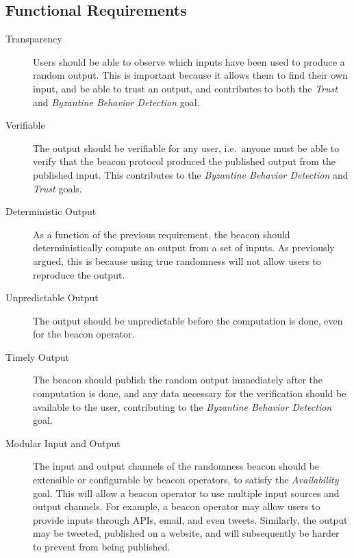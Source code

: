 \subsection{Functional Requirements}
\label{sub:functional_requirements}
\begin{description}
    \item [Transparency]
Users should be able to observe which inputs have been used to produce a random output. This is important because it allows them to find their own input, and be able to trust an output, and contributes to both the \emph{Trust} and \emph{Byzantine Behavior Detection} goal.

    \item[Verifiable]
The output should be verifiable for any user, i.e.\ anyone must be able to verify that the beacon protocol produced the published output from the published input. This contributes to the \emph{Byzantine Behavior Detection} and \emph{Trust} goals.

    \item[Deterministic Output]
As a function of the previous requirement, the beacon should deterministically compute an output from a set of inputs.
As previously argued, this is because using true randomness will not allow users to reproduce the output.

    \item[Unpredictable Output]
The output should be unpredictable before the computation is done, even for the beacon operator.

    \item[Timely Output]
The beacon should publish the random output immediately after the computation is done, and any data necessary for the verification should be available to the user, contributing to the \emph{Byzantine Behavior Detection} goal.

    \item[Modular Input and Output]
The input and output channels of the randomness beacon should be extensible or configurable by beacon operators, to satisfy the \emph{Availability} goal.
This will allow a beacon operator to use multiple input sources and output channels.
For example, a beacon operator may allow users to provide inputs through APIs, email, and even tweets.
Similarly, the output may be tweeted, published on a website, and will subsequently be harder to prevent from being published.




\end{description}
